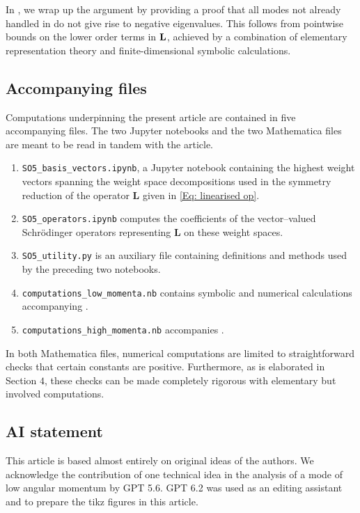 \documentclass[11pt,reqno]{amsart}
\theoremstyle{remark}
\newcommand{\Lf}{\textup{\textbf{L}}}
\theoremstyle{definition}
\begin{document}
In , we wrap up the argument by providing a proof that all modes not already handled in  do not give rise to negative eigenvalues. This follows from pointwise bounds on the lower order terms in $\Lf$, achieved by a combination of elementary representation theory and finite-dimensional symbolic calculations.

\subsection{Accompanying files}

Computations underpinning the present article are contained in five accompanying files. The two Jupyter notebooks and the two Mathematica files are meant to be read in tandem with the article.

\begin{enumerate}
    \item \texttt{SO5\_basis\_vectors.ipynb}, a Jupyter notebook containing the highest weight vectors spanning the weight space decompositions used in the symmetry reduction of the operator $\mathbf L$ given in \eqref{Eq: linearised op}.
    \item \texttt{SO5\_operators.ipynb} computes the coefficients of the vector--valued Schrödinger operators representing $\mathbf L$ on these weight spaces.
    \item \texttt{SO5\_utility.py} is an auxiliary file containing definitions and methods used by the preceding two notebooks.
    \item \texttt{computations\_low\_momenta.nb} contains symbolic and numerical calculations accompanying .
    \item \texttt{computations\_high\_momenta.nb} accompanies .
\end{enumerate}

In both Mathematica files, numerical computations are limited to straightforward checks that certain constants are positive. Furthermore, as is elaborated in Section $4$, these checks can be made completely rigorous with elementary but involved computations. 

\subsection{AI statement}

This article is based almost entirely on original ideas of the authors. We acknowledge the contribution of one technical idea in the analysis of a mode of low angular momentum by GPT 5.6. GPT 6.2 was used as an editing assistant and to prepare the tikz figures in this article.
\end{document}

